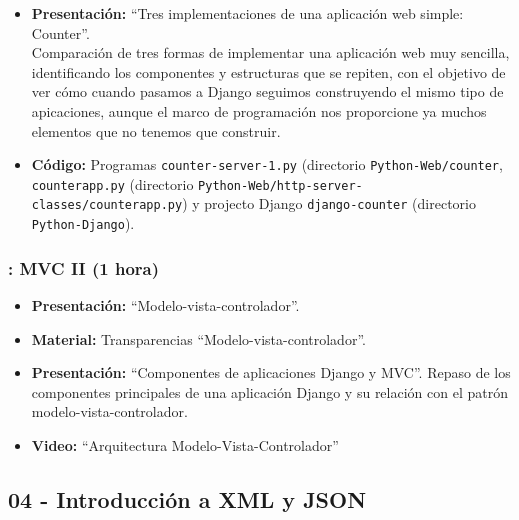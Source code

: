 \documentclass[a4paper,12pt]{article}
\begin{document}
\begin{itemize}
\item \textbf{Presentación:} ``Tres implementaciones de una aplicación web simple: Counter''. \\
  Comparación de tres formas de implementar una aplicación web muy sencilla, identificando los componentes y estructuras que se repiten, con el objetivo de ver cómo cuando pasamos a Django seguimos construyendo el mismo tipo de apicaciones, aunque el marco de programación nos proporcione ya muchos elementos que no tenemos que construir.
\item \textbf{Código:} Programas \verb|counter-server-1.py| (directorio \verb|Python-Web/counter|, \verb|counterapp.py| (directorio \verb|Python-Web/http-server-classes/counterapp.py|) y projecto Django \verb|django-counter| (directorio \verb|Python-Django|).
\end{itemize}

\subsubsection{\juevesI: MVC II (1 hora)}
\label{cal:juevesI}

\begin{itemize}
\item \textbf{Presentación:} ``Modelo-vista-controlador''.
\item \textbf{Material:} Transparencias ``Modelo-vista-controlador''.
\item \textbf{Presentación:} ``Componentes de aplicaciones Django y MVC''.
  Repaso de los componentes principales de una aplicación Django y su relación con el patrón modelo-vista-controlador.
\item \textbf{Video:} ``Arquitectura Modelo-Vista-Controlador''
\end{itemize}


\subsection{04 - Introducción a XML y JSON}
\end{document}
